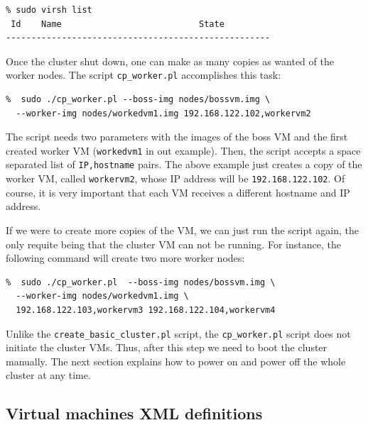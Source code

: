 \documentclass[a4]{article}
\begin{document}
\begin{verbatim}
% sudo virsh list
 Id    Name                           State
----------------------------------------------------
\end{verbatim}


Once the cluster shut down, one can make as many copies as wanted of the
worker nodes. The script \texttt{cp\_worker.pl} accomplishes this task:

\begin{verbatim}
%  sudo ./cp_worker.pl --boss-img nodes/bossvm.img \
  --worker-img nodes/workedvm1.img 192.168.122.102,workervm2
\end{verbatim}

The script needs two parameters with the images of the boss VM and the first
created worker VM (\texttt{workedvm1} in out example). Then, the script
accepts a space separated list of \texttt{IP,hostname} pairs. The above
example just creates a copy of the worker VM, called \texttt{workervm2},
whose IP address will be \texttt{192.168.122.102}. Of course, it is very
important that each VM receives a different hostname and IP address. 

If we were to create more copies of the VM, we can just run the script
again, the only requite being that the cluster VM can not be running. For
instance, the following command will create two more worker nodes:

\begin{verbatim}
%  sudo ./cp_worker.pl  --boss-img nodes/bossvm.img \
  --worker-img nodes/workedvm1.img \
  192.168.122.103,workervm3 192.168.122.104,workervm4
\end{verbatim}

Unlike the \texttt{create\_basic\_cluster.pl} script, the
\texttt{cp\_worker.pl} script does not initiate the cluster VMs. Thus, after
this step we need to boot the cluster manually. The next section explains
how to power on and power off the whole cluster at any time.


\subsection{Virtual machines XML definitions}
\label{sec:virtual-machines-xml}
\end{document}

